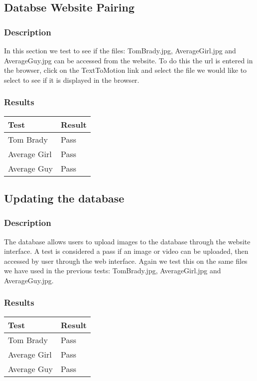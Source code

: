 \documentclass{scrreprt}
\begin{document}
\subsection{Databse Website Pairing}

\subsubsection{Description}

In this section we test to see if the files: TomBrady.jpg, AverageGirl.jpg and
AverageGuy.jpg can be accessed from the website.  To do this the url is
entered in the browser, click on the TextToMotion link and select the file we
would like to select to see if it is displayed in the browser.

\subsubsection{Results}
 \centering
 \begin{tabular}{||p{2.5cm}|p{2.5cm}||}
 \hline
 \bf Test & \bf Result\\
 \hline\hline
  Tom Brady & Pass  \\ 
   \hline\hline
  Average Girl & Pass  \\
   \hline\hline
  Average Guy & Pass  \\
\hline

 \hline
 \end{tabular}

\subsection{Updating the database}
\subsubsection{Description}

The database allows users to upload images to the database through the website
interface. A test is considered a pass if an image or video can be uploaded,
then accessed by user through the web interface.  Again we test this on the
same files we have used in the previous tests: TomBrady.jpg, AverageGirl.jpg
and AverageGuy.jpg.

\subsubsection{Results}
 \centering
 \begin{tabular}{||p{2.5cm}|p{2.5cm}||}
 \hline
 \bf Test & \bf Result\\
 \hline\hline
  Tom Brady & Pass  \\ 
   \hline\hline
  Average Girl & Pass  \\
   \hline\hline
  Average Guy & Pass  \\
\hline

 \hline
 \end{tabular}
\end{document}
